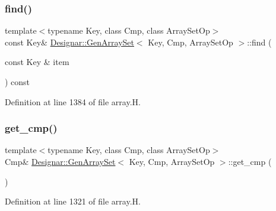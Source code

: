 \subsubsection{\texorpdfstring{find()}{find()}\hspace{0.1cm}{\footnotesize\ttfamily [2/2]}}
{\footnotesize\ttfamily template$<$typename Key, class Cmp, class Array\+Set\+Op$>$ \\
const Key\& \hyperlink{class_designar_1_1_gen_array_set}{Designar\+::\+Gen\+Array\+Set}$<$ Key, Cmp, Array\+Set\+Op $>$\+::find (\begin{DoxyParamCaption}\item[{const Key \&}]{item }\end{DoxyParamCaption}) const\hspace{0.3cm}{\ttfamily [inline]}}



Definition at line 1384 of file array.\+H.

\mbox{\label{class_designar_1_1_gen_array_set_aceb48fb98d254005b82fd538b6ac0c35}} 
\subsubsection{\texorpdfstring{get\+\_\+cmp()}{get\_cmp()}\hspace{0.1cm}{\footnotesize\ttfamily [1/2]}}
{\footnotesize\ttfamily template$<$typename Key, class Cmp, class Array\+Set\+Op$>$ \\
Cmp\& \hyperlink{class_designar_1_1_gen_array_set}{Designar\+::\+Gen\+Array\+Set}$<$ Key, Cmp, Array\+Set\+Op $>$\+::get\+\_\+cmp (\begin{DoxyParamCaption}{ }\end{DoxyParamCaption})\hspace{0.3cm}{\ttfamily [inline]}}



Definition at line 1321 of file array.\+H.

\mbox{\label{class_designar_1_1_gen_array_set_a30409051572881ed638f79debfad8188}} 
